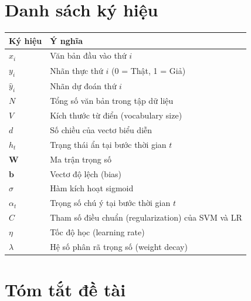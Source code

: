 \documentclass[12pt, a4paper]{report}
\begin{document}
\chapter*{Danh sách ký hiệu}
\label{symbols}

\vspace{0.5em}
\noindent\begin{longtable}{p{2.5cm} p{11.5cm}}
\toprule
\textbf{Ký hiệu} & \textbf{Ý nghĩa} \\
\midrule
$x_i$           & Văn bản đầu vào thứ $i$ \\[0.3em]
$y_i$           & Nhãn thực thứ $i$ (0 = Thật, 1 = Giả) \\[0.3em]
$\hat{y}_i$     & Nhãn dự đoán thứ $i$ \\[0.3em]
$N$             & Tổng số văn bản trong tập dữ liệu \\[0.3em]
$V$             & Kích thước từ điển (vocabulary size) \\[0.3em]
$d$             & Số chiều của vectơ biểu diễn \\[0.3em]
$h_t$           & Trạng thái ẩn tại bước thời gian $t$ \\[0.3em]
$\mathbf{W}$    & Ma trận trọng số \\[0.3em]
$\mathbf{b}$    & Vectơ độ lệch (bias) \\[0.3em]
$\sigma$        & Hàm kích hoạt sigmoid \\[0.3em]
$\alpha_t$      & Trọng số chú ý tại bước thời gian $t$ \\[0.3em]
$C$             & Tham số điều chuẩn (regularization) của SVM và LR \\[0.3em]
$\eta$          & Tốc độ học (learning rate) \\[0.3em]
$\lambda$       & Hệ số phân rã trọng số (weight decay) \\
\bottomrule
\end{longtable}
\newpage

\chapter*{Tóm tắt đề tài}
\label{abstract}
\end{document}
